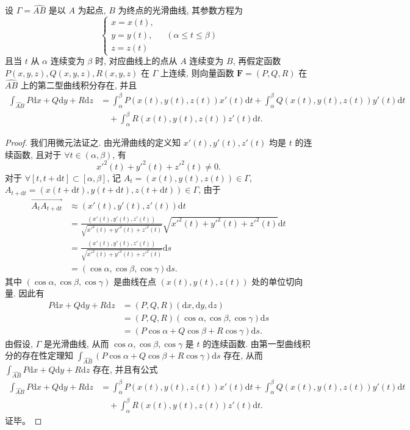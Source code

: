 \documentclass[UTF8,12pt,a4paper,fontset=fandol]{ctexart}
\begin{document}
\begin{theorem}\label{course-theorem-16-2-1}\quad 设 $\Gamma=\widehat{AB}$ 是以 $A$ 为起点, $B$ 为终点的光滑曲线, 其参数方程为
\[
  \begin{cases}
    x=x(t),\\
    y=y(t),\\
    z=z(t)
  \end{cases}
  \quad(\alpha\leqslant t\leqslant \beta)
\]
且当 $t$ 从 $\alpha$ 连续变为 $\beta$ 时, 对应曲线上的点从 $A$ 连续变为 $B$, 再假定函数\allowbreak $P(x,y,z),Q(x,y,z),R(x,y,z)$ 在 $\Gamma$ 上连续, 则向量函数 $\boldsymbol F=(P,Q,R)$ 在 $\widehat{AB}$ 上的第二型曲线积分存在, 并且
\[
\begin{aligned}
  \int_{\widehat{AB}}P\mathrm dx+Q\mathrm dy+R\mathrm dz
  &=\int_\alpha^\beta P(x(t),y(t),z(t))x'(t)\mathrm dt
    +\int_\alpha^\beta Q(x(t),y(t),z(t))y'(t)\mathrm dt\\
  &\quad+\int_\alpha^\beta R(x(t),y(t),z(t))z'(t)\mathrm dt.
\end{aligned}
\]

\end{theorem}
\begin{proof}\quad 我们用微元法证之. 由光滑曲线的定义知 $x'(t),y'(t),z'(t)$ 均是 $t$ 的连续函数, 且对于 $\forall t\in(\alpha,\beta)$, 有
\[
  x'^2(t)+y'^2(t)+z'^2(t)\ne0.
\]
对于 $\forall[t,t+\mathrm dt]\subset[\alpha,\beta]$, 记 $A_t=(x(t),y(t),z(t))\in\Gamma$, $A_{t+\mathrm dt}=(x(t+\mathrm dt),y(t+\mathrm dt),z(t+\mathrm dt))\in\Gamma$, 由于
\[
\begin{aligned}
  \overrightarrow{A_tA_{t+\mathrm dt}}
  &\approx (x'(t),y'(t),z'(t))\mathrm dt\\
  &=\frac{(x'(t),y'(t),z'(t))}
    {\sqrt{x'^2(t)+y'^2(t)+z'^2(t)}}
    \sqrt{x'^2(t)+y'^2(t)+z'^2(t)}\mathrm dt\\
  &=\frac{(x'(t),y'(t),z'(t))}
    {\sqrt{x'^2(t)+y'^2(t)+z'^2(t)}}\mathrm ds\\
  &=(\cos\alpha,\cos\beta,\cos\gamma)\mathrm ds.
\end{aligned}
\]
其中 $(\cos\alpha,\cos\beta,\cos\gamma)$ 是曲线在点 $(x(t),y(t),z(t))$ 处的单位切向量. 因此有
\[
\begin{aligned}
  P\mathrm dx+Q\mathrm dy+R\mathrm dz
  &=(P,Q,R)(\mathrm dx,\mathrm dy,\mathrm dz)\\
  &=(P,Q,R)(\cos\alpha,\cos\beta,\cos\gamma)\mathrm ds\\
  &=(P\cos\alpha+Q\cos\beta+R\cos\gamma)\mathrm ds.
\end{aligned}
\]
由假设, $\Gamma$ 是光滑曲线, 从而 $\cos\alpha,\cos\beta,\cos\gamma$ 是 $t$ 的连续函数. 由第一型曲线积分的存在性定理知 $\int_{\widehat{AB}}(P\cos\alpha+Q\cos\beta+R\cos\gamma)\mathrm ds$ 存在, 从而 $\int_{\widehat{AB}}P\mathrm dx+Q\mathrm dy+R\mathrm dz$ 存在, 并且有公式
\[
\begin{aligned}
  \int_{\widehat{AB}}P\mathrm dx+Q\mathrm dy+R\mathrm dz
  &=\int_\alpha^\beta P(x(t),y(t),z(t))x'(t)\mathrm dt
    +\int_\alpha^\beta Q(x(t),y(t),z(t))y'(t)\mathrm dt\\
  &\quad+\int_\alpha^\beta R(x(t),y(t),z(t))z'(t)\mathrm dt.
\end{aligned}
\]
证毕。

\end{proof}
\end{document}
